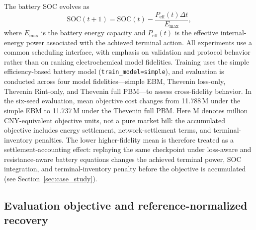 The battery SOC evolves as
\begin{equation}
\mathrm{SOC}(t+1)=\mathrm{SOC}(t)-\frac{P_{\mathrm{eff}}(t)\Delta t}{E_{\max}},
\label{eq:soc_update_morphology}
\end{equation}
where $E_{\max}$ is the battery energy capacity and $P_{\mathrm{eff}}(t)$ is the effective internal-energy power associated with the achieved terminal action. All experiments use a common scheduling interface, with emphasis on validation and protocol behavior rather than on ranking electrochemical model fidelities. Training uses the simple efficiency-based battery model (\texttt{train\_model=simple}), and evaluation is conducted across four model fidelities---simple EBM, Thevenin loss-only, Thevenin Rint-only, and Thevenin full PBM---to assess cross-fidelity behavior. In the six-seed evaluation, mean objective cost changes from 11.788\,M\textyen{} under the simple EBM to 11.737\,M\textyen{} under the Thevenin full PBM. Here M\textyen{} denotes million CNY-equivalent objective units, not a pure market bill: the accumulated objective includes energy settlement, network-settlement terms, and terminal-inventory penalties. The lower higher-fidelity mean is therefore treated as a settlement-accounting effect: replaying the same checkpoint under loss-aware and resistance-aware battery equations changes the achieved terminal power, SOC integration, and terminal-inventory penalty before the objective is accumulated (see Section~\ref{sec:case_study}).

\subsection{Evaluation objective and reference-normalized recovery}

